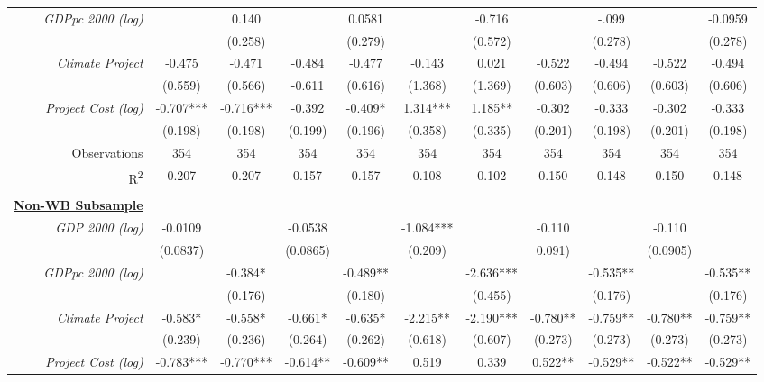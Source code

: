 \documentclass{article}
\begin{document}
\begin{singlespace}
\begin{landscape}
\begin{table}[H]
{\begin{tabular}{rcccccccccc}
					\textit{GDPpc 2000 (log)} &  & 0.140 &  & 0.0581 &  & -0.716 &  & -.099 &  & -0.0959 \\
					\textit{} &  & (0.258) &  & (0.279) &  & (0.572) &  & (0.278) &  & (0.278) \\
					\textit{Climate Project} & -0.475 & -0.471 & -0.484 & -0.477 & -0.143 & 0.021 & -0.522 & -0.494 & -0.522 & -0.494 \\
					\textit{} & (0.559) & (0.566) & -0.611 & (0.616) & (1.368) & (1.369) & (0.603) & (0.606) & (0.603) & (0.606) \\
					\textit{Project Cost (log)} & -0.707*** & -0.716*** & -0.392 & -0.409* & 1.314*** & 1.185** & -0.302 & -0.333 & -0.302 & -0.333 \\
					\textit{} & (0.198) & (0.198) & (0.199) & (0.196) & (0.358) & (0.335) & (0.201) & (0.198) & (0.201) & (0.198) \\ \hline
					Observations & 354 & 354 & 354 & 354 & 354 & 354 & 354 & 354 & 354 & 354 \\
					R\textsuperscript{2} & 0.207 & 0.207 & 0.157 & 0.157 & 0.108 & 0.102 & 0.150 & 0.148 & 0.150 & 0.148 \\ \hline
					\multicolumn{1}{l}{\textit{}} & \multicolumn{1}{l}{} & \multicolumn{1}{l}{} & \multicolumn{1}{l}{} & \multicolumn{1}{l}{} & \multicolumn{1}{l}{} & \multicolumn{1}{l}{} & \multicolumn{1}{l}{} & \multicolumn{1}{l}{} & \multicolumn{1}{l}{} & \multicolumn{1}{l}{} \\
					{\ul \textbf{Non-WB Subsample}} &  &  &  &  &  &  &  &  &  &  \\
					\textit{GDP 2000 (log)} & -0.0109 &  & -0.0538 &  & -1.084*** &  & -0.110 &  & -0.110 &  \\
					\textit{} & (0.0837) &  & (0.0865) &  & (0.209) &  & 0.091) &  & (0.0905) &  \\
					\textit{GDPpc 2000 (log)} &  & -0.384* &  & -0.489** &  & -2.636*** &  & -0.535** &  & -0.535** \\
					\textit{} &  & (0.176) &  & (0.180) &  & (0.455) &  & (0.176) &  & (0.176) \\
					\textit{Climate Project} & -0.583* & -0.558* & -0.661* & -0.635* & -2.215** & -2.190*** & -0.780** & -0.759** & -0.780** & -0.759** \\
					\textit{} & (0.239) & (0.236) & (0.264) & (0.262) & (0.618) & (0.607) & (0.273) & (0.273) & (0.273) & (0.273) \\
					\textit{Project Cost (log)} & -0.783*** & -0.770*** & -0.614** & -0.609** & 0.519 & 0.339 & 0.522** & -0.529** & -0.522** & -0.529** \\

\end{tabular}}
\end{table}
\end{landscape}
\end{singlespace}
\end{document}
